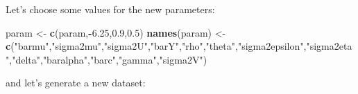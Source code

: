 \documentclass[]{book}
\newenvironment{Shaded}{\begin{snugshade}}{\end{snugshade}}
\newcommand{\KeywordTok}[1]{\textcolor[rgb]{0.13,0.29,0.53}{\textbf{#1}}}
\newcommand{\FloatTok}[1]{\textcolor[rgb]{0.00,0.00,0.81}{#1}}
\newcommand{\StringTok}[1]{\textcolor[rgb]{0.31,0.60,0.02}{#1}}
\newcommand{\OperatorTok}[1]{\textcolor[rgb]{0.81,0.36,0.00}{\textbf{#1}}}
\newcommand{\NormalTok}[1]{#1}
\theoremstyle{definition}
\theoremstyle{definition}
\theoremstyle{definition}
\theoremstyle{remark}
\begin{document}
Let's choose some values for the new parameters:

\begin{Shaded}
\begin{Highlighting}[]
\NormalTok{param <-}\StringTok{ }\KeywordTok{c}\NormalTok{(param,}\OperatorTok{-}\FloatTok{6.25}\NormalTok{,}\FloatTok{0.9}\NormalTok{,}\FloatTok{0.5}\NormalTok{)}
\KeywordTok{names}\NormalTok{(param) <-}\StringTok{ }\KeywordTok{c}\NormalTok{(}\StringTok{"barmu"}\NormalTok{,}\StringTok{"sigma2mu"}\NormalTok{,}\StringTok{"sigma2U"}\NormalTok{,}\StringTok{"barY"}\NormalTok{,}\StringTok{"rho"}\NormalTok{,}\StringTok{"theta"}\NormalTok{,}\StringTok{"sigma2epsilon"}\NormalTok{,}\StringTok{"sigma2eta"}\NormalTok{,}\StringTok{"delta"}\NormalTok{,}\StringTok{"baralpha"}\NormalTok{,}\StringTok{"barc"}\NormalTok{,}\StringTok{"gamma"}\NormalTok{,}\StringTok{"sigma2V"}\NormalTok{)}
\end{Highlighting}
\end{Shaded}

and let's generate a new dataset:
\end{document}
